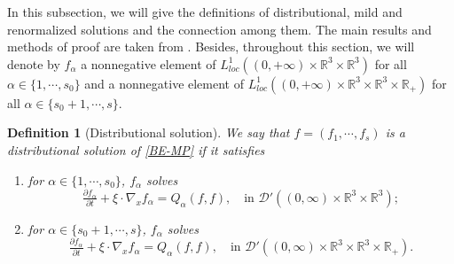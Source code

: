 \documentclass[reqno,11pt]{amsart}
\newtheorem{definition}{Definition}[section]
\numberwithin{equation}{section}
\def\R{\mathbb{R}}
\begin{document}
In this subsection, we will give the definitions of distributional, mild and renormalized solutions and the connection among them. The main results and methods of proof are taken from \cite{Diperna-Lions}. Besides, throughout this section,
we will denote by $f_\alpha$ a nonnegative element of $L^1_{loc} ((0,+\infty)\times \R^3 \times \R^3)$ for all $\alpha \in \{1,\cdots,s_0\}$ and a nonnegative element of $L^1_{loc} ((0,+\infty)\times \R^3 \times \R^3\times \R_+)$ for all $\alpha \in \{s_0+1,\cdots,s\}$.
 
\begin{definition}[Distributional solution]\label{def-distributed}
		We say that $f=(f_1,\cdots,f_s)$ is a distributional solution of \eqref{BE-MP} if it satisfies 
	\begin{enumerate}
		\item {for $\alpha \in \{1,\cdots,s_0\}$, $f_\alpha$ solves
			\begin{equation*}
				\tfrac{\partial f_\alpha}{\partial t } + \xi \cdot \nabla_{x} f_\alpha = Q_\alpha (f,f), \quad \text{in } \mathscr{D}'((0,\infty)\times \R^3 \times \R^3);
		\end{equation*} }
		\item {for $\alpha \in \{s_0+1,\cdots ,s\}$, $f_\alpha$ solves
			\begin{equation}\label{distribution solution}
				\tfrac{\partial f_\alpha}{\partial t } + \xi \cdot \nabla_{x} f_\alpha = Q_\alpha (f,f), \quad \text{in } \mathscr{D}'((0,\infty)\times \R^3 \times \R^3\times \R_+).
		\end{equation}}
	\end{enumerate}
\end{definition}
\end{document}
